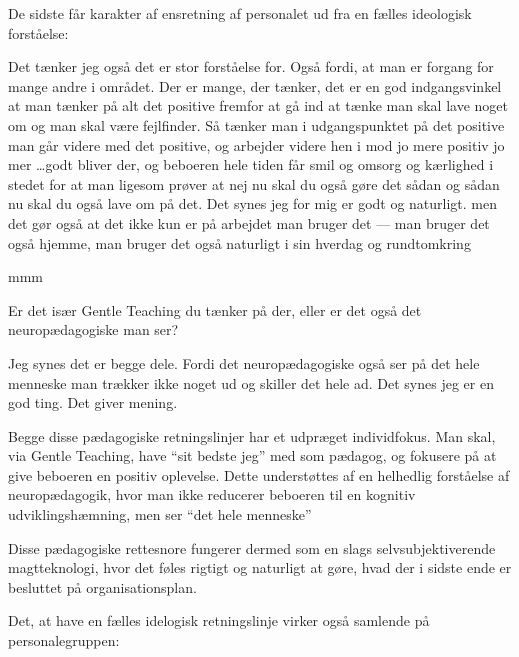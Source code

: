 De sidste får karakter af ensretning af personalet ud fra en fælles ideologisk forståelse:
\begin{description}

\AMB
Det tænker jeg også det er stor forståelse for. Også fordi, at man er forgang for mange andre i området.
Der er mange, der tænker, det er en god indgangsvinkel at man tænker på alt det positive fremfor at gå ind at tænke man skal lave noget om og man skal være fejlfinder.
Så tænker man i udgangspunktet på det positive man går videre med det positive, og arbejder videre hen i mod jo mere positiv jo mer \ldots godt bliver der, og beboeren hele tiden får smil og omsorg og kærlighed i stedet for at man ligesom prøver at nej nu skal du også gøre det sådan og sådan nu skal du også lave om på det.
Det synes jeg for mig er godt og naturligt. men det gør også at det ikke kun er på arbejdet man bruger det — man bruger det også hjemme, man bruger det også naturligt i sin hverdag og rundtomkring

\DMC
mmm

\MAA
Er det især Gentle Teaching du tænker på der, eller er det også det neuropædagogiske man ser?

\AMB
Jeg synes det er begge dele. Fordi det neuropædagogiske også ser på det hele menneske man  trækker ikke noget ud og skiller det hele ad.
Det synes jeg er en god ting.
Det giver mening.
\end{description}

Begge disse pædagogiske retningslinjer har et udpræget individfokus.
Man skal, via Gentle Teaching, have “sit bedste jeg” med som pædagog, og fokusere på at give beboeren en positiv oplevelse.
Dette understøttes af en helhedlig forståelse af neuropædagogik, hvor man ikke reducerer beboeren til en kognitiv udviklingshæmning, men ser “det hele menneske”

Disse pædagogiske rettesnore fungerer dermed som en slags selvsubjektiverende magtteknologi, hvor det føles rigtigt og naturligt at gøre, hvad der i sidste ende er besluttet på organisationsplan.

Det, at have en fælles idelogisk retningslinje virker også samlende på personalegruppen:

